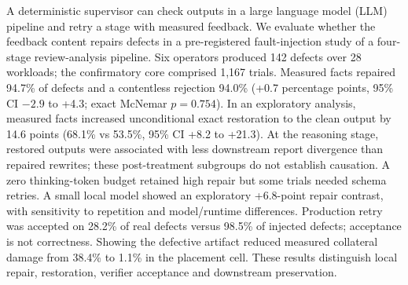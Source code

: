 A deterministic supervisor can check outputs in a large language model (LLM)
pipeline and retry a stage with measured feedback. We evaluate whether the
feedback content repairs defects in a pre-registered fault-injection study of a
four-stage review-analysis pipeline. Six operators produced 142 defects over 28
workloads; the confirmatory core comprised 1,167 trials. Measured facts repaired
94.7\% of defects and a contentless rejection 94.0\% (+0.7 percentage points,
95\% CI $-2.9$ to +4.3; exact McNemar $p=0.754$). In an exploratory analysis,
measured facts increased unconditional exact restoration to the clean output by
14.6 points (68.1\% vs 53.5\%, 95\% CI +8.2 to +21.3). At the reasoning stage, restored outputs were
associated with less downstream report divergence than repaired rewrites;
these post-treatment subgroups do not establish causation. A zero thinking-token
budget retained high repair but some trials needed schema retries. A small local
model showed an exploratory +6.8-point repair contrast, with sensitivity to
repetition and model/runtime differences. Production retry was accepted on
28.2\% of real defects versus 98.5\% of injected defects; acceptance is not
correctness. Showing the defective artifact reduced measured collateral damage
from 38.4\% to 1.1\% in the placement cell. These results distinguish local
repair, restoration, verifier acceptance and downstream preservation.
